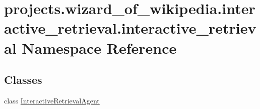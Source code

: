 \hypertarget{namespaceprojects_1_1wizard__of__wikipedia_1_1interactive__retrieval_1_1interactive__retrieval}{}\section{projects.\+wizard\+\_\+of\+\_\+wikipedia.\+interactive\+\_\+retrieval.\+interactive\+\_\+retrieval Namespace Reference}
\label{namespaceprojects_1_1wizard__of__wikipedia_1_1interactive__retrieval_1_1interactive__retrieval}
\subsection*{Classes}
\begin{DoxyCompactItemize}
\item 
class \hyperlink{classprojects_1_1wizard__of__wikipedia_1_1interactive__retrieval_1_1interactive__retrieval_1_1InteractiveRetrievalAgent}{Interactive\+Retrieval\+Agent}
\end{DoxyCompactItemize}
